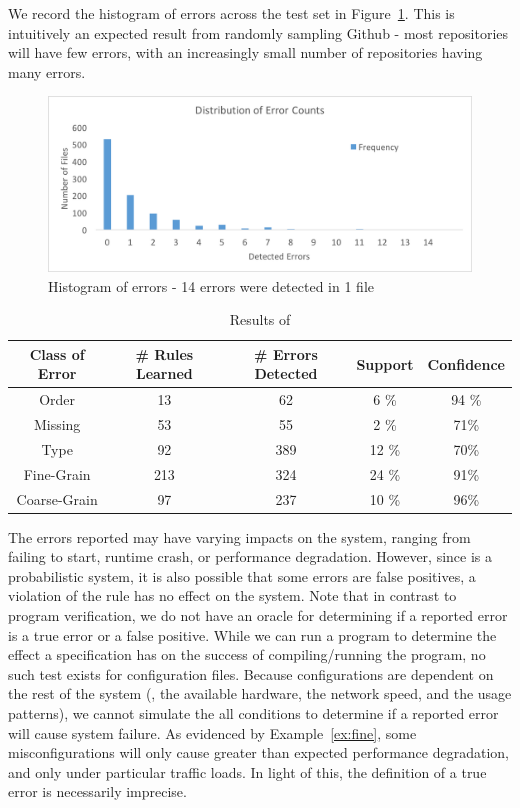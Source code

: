 We record the histogram of errors across the test set in Figure~\ref{fig:histo}.
This is intuitively an expected result from randomly sampling Github - most repositories will have few errors, with an increasingly small number of repositories having many errors.

\begin{figure}[h]
\includegraphics[width=\textwidth]{figs/histogram.png}
\caption{Histogram of errors - 14 errors were detected in 1 file}
\label{fig:histo}
\end{figure}

\begin{table}[h]
\centering
\caption{Results of \app}
\label{table:learning}
\setlength{\tabcolsep}{0.5em}
\begin{tabular}{|c|c|c|c|c|}
\hline
{\bf Class of Error } & {\bf \# Rules Learned} & {\bf \# Errors Detected} & {\bf Support} & {\bf Confidence}\\ 
\hline
\hline
Order        & 13  & 62   & 6 \%  & 94 \% \\ 
Missing      & 53  & 55   & 2 \%  & 71\% \\ 
Type         & 92  & 389  & 12 \% & 70\%  \\ 
Fine-Grain   & 213 & 324  & 24 \% & 91\%  \\ 
Coarse-Grain & 97  & 237  & 10 \% & 96\% \\ 
\hline 
\end{tabular}
\end{table}

The errors reported may have varying impacts on the system, ranging from failing to start, runtime crash, or performance degradation.
However, since \app is a probabilistic system, it is also possible that some errors are false positives, a violation of the rule has no effect on the system.
Note that in contrast to program verification, we do not have an oracle for determining if a reported error is a true error or a false positive.
While we can run a program to determine the effect a specification has on the success of compiling/running the program, no such test exists for configuration files.
Because configurations are dependent on the rest of the system (\ie, the available hardware, the network speed, and the usage patterns), we cannot simulate the all conditions to determine if a reported error will cause system failure.
As evidenced by Example~\ref{ex:fine}, some misconfigurations will only cause greater than expected performance degradation, and only under particular traffic loads.
In light of this, the definition of a true error is necessarily imprecise.

